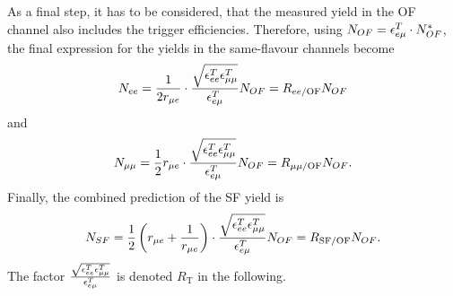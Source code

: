 As a final step, it has to be considered, that the measured yield in the OF channel also includes the trigger efficiencies. Therefore, using $N_{OF} = \epsilon_{e\mu}^T \cdot N_{OF}^{*}$, the final expression for the yields in the same-flavour channels become
\begin{equation}
N_{ee} = \frac{1}{2r_{\mu e}} \cdot \frac{\sqrt{\epsilon_{ee}^T \epsilon_{\mu\mu}^T}}{\epsilon_{e\mu}^T} N_{OF} = R_\text{$ee$/OF} N_{OF}
\label{eq:nee}
\end{equation} 
and
\begin{equation}
N_{\mu\mu} = \frac{1}{2}r_{\mu e}  \cdot \frac{\sqrt{\epsilon_{ee}^T \epsilon_{\mu\mu}^T}}{\epsilon_{e\mu}^T} N_{OF} = R_\text{$\mu\mu$/OF} N_{OF}.
\label{eq:nmm}
\end{equation} 
Finally, the combined prediction of the SF yield is
\begin{equation}
N_{SF} = \frac{1}{2}\left(r_{\mu e} + \frac{1}{r_{\mu e}}\right) \cdot \frac{\sqrt{\epsilon_{ee}^T \epsilon_{\mu\mu}^T}}{\epsilon_{e\mu}^T}  N_{OF} = R_{\text{SF/OF}} N_{OF}.
\label{eq:nsf}
\end{equation}
The factor $\frac{\sqrt{\epsilon_{ee}^T \epsilon_{\mu\mu}^T}}{\epsilon_{e\mu}^T}$ is denoted $R_{\text{T}}$ in the following.
